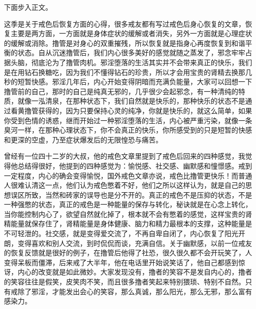 下面步入正文。

这季是关于戒色后恢复方面的心得，很多戒友都有写过戒色后身心恢复的文章，恢复主要是两方面，一方面就是身体症状的缓解或者消失，另外一方面就是心理症状的缓解或消除。撸管是对身心的双重摧残，所以恢复就是指身心再度恢复到和谐平衡的状态。自从沉迷撸管后，我们内心很多美好的感觉就随之蒸发了，邪念牢牢占据头脑，彻底沦为了撸管肉机。邪淫堕落的生活其实并不会带来真正的快乐，我们是在用钻石换糖吃，因为我们不懂得钻石的珍贵，所以才会用宝贵的肾精去换那几秒的短暂快感。邪淫几年后，内心开始变得阴暗而充满负能量，大家可以回想一下撸管前的自己，那时的自己是纯真无邪的，几乎很少会起邪念，有一种清纯的特质，就像一泓清泉，在那种状态下，我们自然就是快乐的，那种快乐的状态不是通过看黄撸管获得的，因为只要保持心灵的纯净，你就是快乐的，就这么简单，如果你受到色情的诱惑，继而开始过一种邪淫堕落的生活，内心被严重污染，就像一条臭河一样，在那种心理状态下，你不会真正的快乐，你所感受到的只是短暂的快感和更深的空虚，乃至症状爆发后的无限惶恐与痛苦。

曾经有一位四十二岁的大叔，他的戒色文章里提到了戒色后回来的四种感觉，我觉得他总结得很好，他提到的四种感觉为：愉悦感、社交感、幽默感和憧憬感。戒到一定程度，内心的确会变得愉悦，国外戒色文章亦说，戒色比撸管更快乐！而普通人很难认清这一点，他们认为戒色憋着不好，他们之所以这样认为，就是自己的思想误区所致，当然和砖家的误导也是分不开的。真正的戒色不是压抑的状态，不是一种强憋的状态，真正的戒色是一种能量的保存与转化，秘诀就是在心念上转化，当你能控制内心了，欲望自然就化掉了，根本就不会有憋着的感觉，这样宝贵的肾精能量就保存住了，肾精能量是身体健康、脑力和精力最根本的支撑，这种能量是不可轻泄的。社交感，就是变得爱交流了，不再自卑自闭了，内心恢复了阳光开朗，变得喜欢和别人交流，到时侃侃而谈，充满自信。关于幽默感，以前一位戒友的恢复反馈就是很好的例子，在撸管后他得了社恐，很久很久都不会开玩笑了，人变得呆板而僵滞，后来戒了大半年，他在电话里开始说笑话了，他自己都感到惊讶，内心的改变就是如此微妙。大家发现没有，撸者的笑容不是发自内心的，撸者的笑容往往是假笑，皮笑肉不笑，而且很多撸者笑起来特别猥琐、特别不自然。只有戒除了邪淫，才能发出会心的笑容，那么真诚，那么阳光，那么无邪，那么富有感染力。

